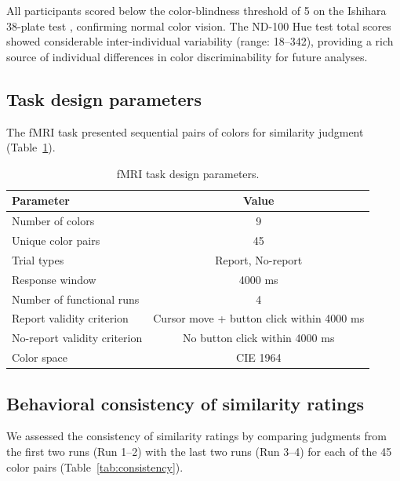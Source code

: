 \documentclass[11pt]{article}
\begin{document}
All participants scored below the color-blindness threshold of 5 on the Ishihara 38-plate test \citep{ishihara1917}, confirming normal color vision. The ND-100 Hue test total scores showed considerable inter-individual variability (range: 18--342), providing a rich source of individual differences in color discriminability for future analyses.

\subsection{Task design parameters}

The fMRI task presented sequential pairs of colors for similarity judgment (Table~\ref{tab:task}).

\begin{table}[H]
\centering
\caption{fMRI task design parameters.}
\label{tab:task}
\begin{tabular}{lc}
\toprule
\textbf{Parameter} & \textbf{Value} \\
\midrule
Number of colors & 9 \\
Unique color pairs & 45 \\
Trial types & Report, No-report \\
Response window & 4000 ms \\
Number of functional runs & 4 \\
Report validity criterion & Cursor move + button click within 4000 ms \\
No-report validity criterion & No button click within 4000 ms \\
Color space & CIE 1964 \\
\bottomrule
\end{tabular}
\end{table}

\subsection{Behavioral consistency of similarity ratings}

We assessed the consistency of similarity ratings by comparing judgments from the first two runs (Run 1--2) with the last two runs (Run 3--4) for each of the 45 color pairs (Table~\ref{tab:consistency}).
\end{document}
